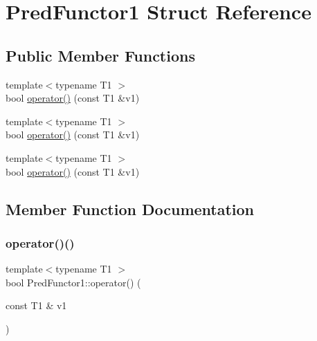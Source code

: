 \hypertarget{struct_pred_functor1}{}\section{Pred\+Functor1 Struct Reference}
\label{struct_pred_functor1}
\subsection*{Public Member Functions}
\begin{DoxyCompactItemize}
\item 
{\footnotesize template$<$typename T1 $>$ }\\bool \mbox{\hyperlink{struct_pred_functor1_a78d81d1bac0ee7f81ea631c49bfab3e2}{operator()}} (const T1 \&v1)
\item 
{\footnotesize template$<$typename T1 $>$ }\\bool \mbox{\hyperlink{struct_pred_functor1_a78d81d1bac0ee7f81ea631c49bfab3e2}{operator()}} (const T1 \&v1)
\item 
{\footnotesize template$<$typename T1 $>$ }\\bool \mbox{\hyperlink{struct_pred_functor1_a78d81d1bac0ee7f81ea631c49bfab3e2}{operator()}} (const T1 \&v1)
\end{DoxyCompactItemize}


\subsection{Member Function Documentation}
\mbox{\label{struct_pred_functor1_a78d81d1bac0ee7f81ea631c49bfab3e2}} 
\subsubsection{\texorpdfstring{operator()()}{operator()()}\hspace{0.1cm}{\footnotesize\ttfamily [1/3]}}
{\footnotesize\ttfamily template$<$typename T1 $>$ \\
bool Pred\+Functor1\+::operator() (\begin{DoxyParamCaption}\item[{const T1 \&}]{v1 }\end{DoxyParamCaption})\hspace{0.3cm}{\ttfamily [inline]}}

\mbox{\label{struct_pred_functor1_a78d81d1bac0ee7f81ea631c49bfab3e2}} 
